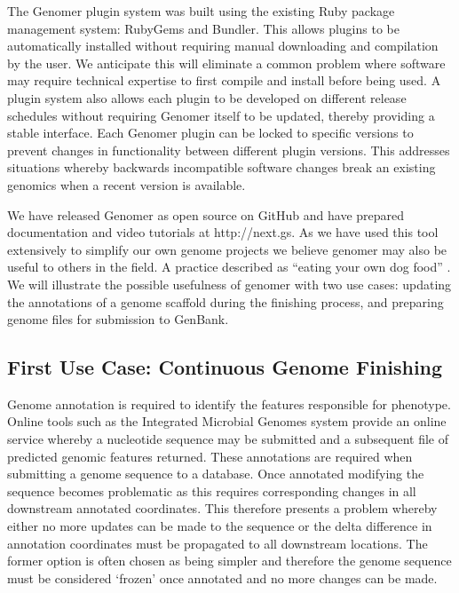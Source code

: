 \documentclass[10pt]{article}
\begin{document}
The Genomer plugin system was built using the existing Ruby package management
system: RubyGems and Bundler. This allows plugins to be automatically installed
without requiring manual downloading and compilation by the user. We anticipate
this will eliminate a common problem where software may require technical
expertise to first compile and install before being used. A plugin system also
allows each plugin to be developed on different release schedules without
requiring Genomer itself to be updated, thereby providing a stable interface.
Each Genomer plugin can be locked to specific versions to prevent changes in
functionality between different plugin versions. This addresses situations
whereby backwards incompatible software changes break an existing genomics when
a recent version is available.

We have released Genomer as open source on GitHub \cite{genomer-github} and
have prepared documentation and video tutorials at http://next.gs. As we have
used this tool extensively to simplify our own genome projects we believe
genomer may also be useful to others in the field. A practice described as
``eating your own dog food'' \cite{harrison2006}. We will illustrate the
possible usefulness of genomer with two use cases: updating the annotations of
a genome scaffold during the finishing process, and preparing genome files for
submission to GenBank.

\subsection*{First Use Case: Continuous Genome Finishing}

Genome annotation is required to identify the features responsible for
phenotype. Online tools such as the Integrated Microbial Genomes system
\cite{markowitz2006} provide an online service whereby a nucleotide sequence
may be submitted and a subsequent file of predicted genomic features returned.
These annotations are required when submitting a genome sequence to a database.
Once annotated modifying the sequence becomes problematic as this requires
corresponding changes in all downstream annotated coordinates. This therefore
presents a problem whereby either no more updates can be made to the sequence
or the delta difference in annotation coordinates must be propagated to all
downstream locations. The former option is often chosen as being simpler and
therefore the genome sequence must be considered `frozen' once annotated and no
more changes can be made.
\end{document}

